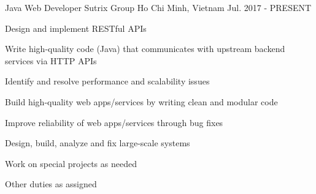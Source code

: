 

\begin{cventries}

  \cventry
    {Java Web Developer} %
    {Sutrix Group} %
    {Ho Chi Minh, Vietnam} %
    {Jul. 2017 - PRESENT} %
    {
      \begin{cvitems} %
        \item {Design and implement RESTful APIs}
        \item {Write high-quality code (Java) that communicates with upstream backend services via HTTP APIs}
        \item {Identify and resolve performance and scalability issues}
        \item {Build high-quality web apps/services by writing clean and modular code}
        \item {Improve reliability of web apps/services through bug fixes}
        \item {Design, build, analyze and fix large-scale systems}
        \item {Work on special projects as needed}
        \item {Other duties as assigned}
      \end{cvitems}
    }


\end{cventries}
